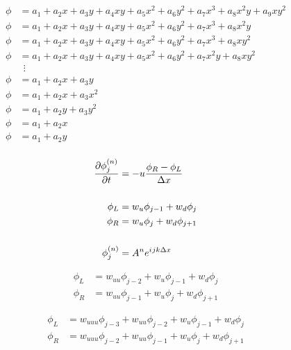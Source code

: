 \documentclass{article}
\newcommand{\iu}{{i\mkern1mu}}
\begin{document}
\begin{align*}
	\phi &= a_1 + a_2 x + a_3 y + a_4 x y + a_5 x^2 + a_6 y^2 + a_7 x^3 + a_8 x^2 y + a_9 x y^2 \\
	\phi &= a_1 + a_2 x + a_3 y + a_4 x y + a_5 x^2 + a_6 y^2 + a_7 x^3 + a_8 x^2 y \\
	\phi &= a_1 + a_2 x + a_3 y + a_4 x y + a_5 x^2 + a_6 y^2 + a_7 x^3 + a_8 x y^2 \\
	\phi &= a_1 + a_2 x + a_3 y + a_4 x y + a_5 x^2 + a_6 y^2 + a_7 x^2 y + a_8 x y^2 \\
	&\:\:\vdots \\
	\phi &= a_1 + a_2 x + a_3 y \\
	\phi &= a_1 + a_2 x + a_3 x^2 \\
	\phi &= a_1 + a_2 y + a_3 y^2 \\
	\phi &= a_1 + a_2 x \\
	\phi &= a_1 + a_2 y \\
\end{align*}
\newpage

\begin{align*}
	\frac{\partial \phi^{(n)}_j}{\partial t} &= -u \frac{\phi_R - \phi_L}{\Delta x} \\
	\\
\phi_L &= w_u \phi_{j-1} + w_d \phi_j \\
\phi_R &= w_u \phi_j + w_d \phi_{j+1} \\
\\
	\phi_j^{(n)} &= A^n e^{\iu j k \Delta x}
\end{align*}

\begin{align*}
	\phi_L &= w_{uu} \phi_{j-2} + w_u \phi_{j-1} + w_d \phi_j \\
	\phi_R &= w_{uu} \phi_{j-1} + w_u \phi_j + w_d \phi_{j+1}
\end{align*}

\begin{align*}
	\phi_L &= w_{uuu} \phi_{j-3} + w_{uu} \phi_{j-2} + w_u \phi_{j-1} + w_d \phi_j \\
	\phi_R &= w_{uuu} \phi_{j-2} + w_{uu} \phi_{j-1} + w_u \phi_j + w_d \phi_{j+1}
\end{align*}

\newpage
\end{document}
